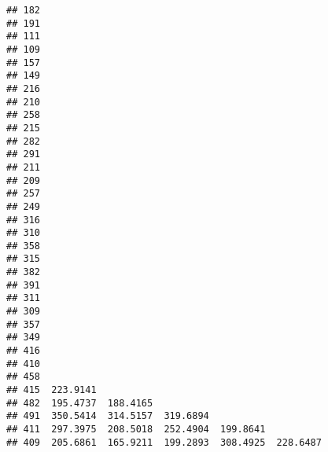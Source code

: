 \documentclass[
]{article}
\begin{document}
\begin{verbatim}
## 182                                                                      
## 191                                                                      
## 111                                                                      
## 109                                                                      
## 157                                                                      
## 149                                                                      
## 216                                                                      
## 210                                                                      
## 258                                                                      
## 215                                                                      
## 282                                                                      
## 291                                                                      
## 211                                                                      
## 209                                                                      
## 257                                                                      
## 249                                                                      
## 316                                                                      
## 310                                                                      
## 358                                                                      
## 315                                                                      
## 382                                                                      
## 391                                                                      
## 311                                                                      
## 309                                                                      
## 357                                                                      
## 349                                                                      
## 416                                                                      
## 410                                                                      
## 458                                                                      
## 415  223.9141                                                            
## 482  195.4737  188.4165                                                  
## 491  350.5414  314.5157  319.6894                                        
## 411  297.3975  208.5018  252.4904  199.8641                              
## 409  205.6861  165.9211  199.2893  308.4925  228.6487                    

\end{verbatim}
\end{document}
